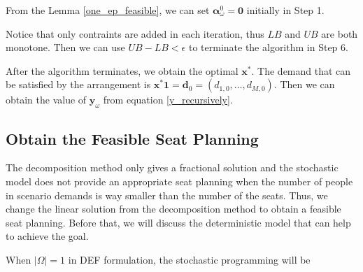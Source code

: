 \begin{remark}
From the Lemma \ref{one_ep_feasible}, we can set $\bm{\alpha}_{\omega}^0 = \mathbf{0}$ initially in Step 1.
\end{remark}

\begin{remark}
  Notice that only contraints are added in each iteration, thus $LB$ and $UB$ are both monotone. Then we can use $UB - LB < \epsilon$ to terminate the algorithm in Step 6.
\end{remark}

After the algorithm terminates, we obtain the optimal $\mathbf{x}^{*}$. The demand that can be satisfied by the arrangement is $\mathbf{x}^{*} \mathbf{1} = \mathbf{d}_0 = (d_{1,0},\ldots,d_{M,0})$.
Then we can obtain the value of $\mathbf{y}_{\omega}$ from equation \eqref{y_recursively}.


\subsection{Obtain the Feasible Seat Planning}\label{seat_assignment}
The decomposition method only gives a fractional solution and the stochastic model does not provide an appropriate seat planning when the number of people in scenario demands is way smaller than the number of the seats. Thus, we change the linear solution from the decomposition method to obtain a feasible seat planning. Before that, we will discuss the deterministic model that can help to achieve the goal. 


When $|\Omega| =1$ in DEF formulation, the stochastic programming will be 

